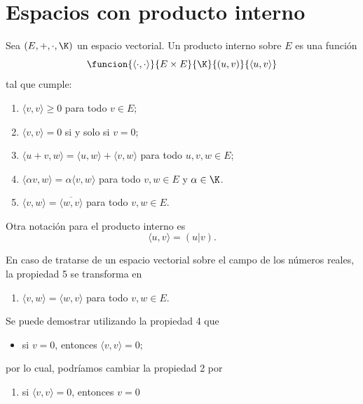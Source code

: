 \documentclass[a4,11pt]{aleph-notas}
\begin{document}
\encabezado

\section{Espacios con producto interno}

\begin{defi}
    Sea $(E,+,\cdot,\K)$ un espacio vectorial. Un producto interno sobre $E$ es una función
    \[
        \funcion{\langle \cdot, \cdot \rangle}{E\times E}{\K}{(u,v)}{\langle u, v \rangle}
    \]
    tal que cumple:
    \begin{enumerate}
        \item 
            $\langle v, v \rangle \geq 0$ para todo $ v \in E$;
        \item 
            $\langle v,v \rangle = 0$ si y solo si $ v = 0$;
        \item 
            $\langle u + v, w \rangle = \langle u,w \rangle + \langle v,w\rangle $ para todo $u,v,w \in E$;
        \item
            $\langle \alpha v,w \rangle = \alpha \langle v,w \rangle$ para todo $v,w \in E$ y $\alpha\in\K$.
        \item
            $\langle v,w \rangle = \overline{\langle w, v \rangle}$ para todo $v,w \in E$.
    \end{enumerate}
\end{defi}


\begin{advertencia}
    Otra notación para el producto interno es
    \[
        \langle u , v \rangle
        = (u|v).
    \]
\end{advertencia}

\begin{advertencia}
    En caso de tratarse de un espacio vectorial sobre el campo de los números reales, la propiedad 5 se transforma en
    \begin{enumerate}[start=5]
        \item
            $\langle v,w \rangle = \langle w, v \rangle$ para todo $v,w \in E$.
    \end{enumerate}
\end{advertencia}


\begin{advertencia}
    Se puede demostrar utilizando la propiedad 4 que
    \begin{itemize}
        \item
            si $v = 0$, entonces $\langle v,v \rangle = 0$;
    \end{itemize}
    por lo cual, podríamos cambiar la propiedad 2 por
    \begin{enumerate}[start=2]
        \item
            si $\langle v,v \rangle = 0$, entonces $ v = 0$
    \end{enumerate}
\end{advertencia}
\end{document}
